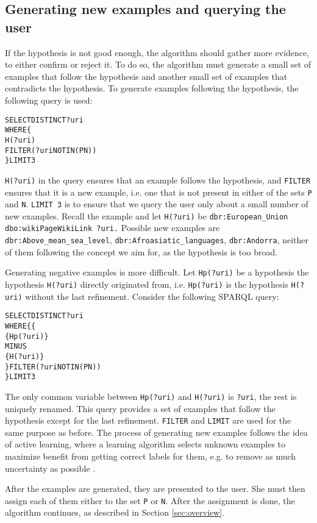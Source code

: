 \documentclass{llncs}
\begin{document}
\subsection{Generating new examples and querying the user\label{sec:new_examples}}

If the hypothesis is not good enough, the algorithm should gather more evidence, to either confirm or reject it.
To do so, the algorithm must generate a small set of examples that follow the hypothesis and another small set of examples that contradicts the hypothesis.
To generate examples following the hypothesis, the following query is used:
\begin{alltt}
SELECT DISTINCT ?uri
WHERE \{
    H(?uri)
    FILTER(?uri NOT IN (P N))
\} LIMIT 3
\end{alltt}
\texttt{H(?uri)} in the query ensures that an example follows the hypothesis, and \texttt{FILTER} ensures that it is a new example, i.e. one that is not present in either of the sets \texttt{P} and \texttt{N}.
\texttt{LIMIT 3} is to ensure that we query the user only about a small number of new examples.
Recall the example and let \texttt{H(?uri)} be \texttt{dbr:European\_Union dbo:wikiPageWikiLink ?uri.} Possible new examples are \texttt{dbr:Above\_mean\_sea\_level}, \texttt{dbr:Afroasiatic\_languages}, \texttt{dbr:Andorra}, neither of them following the concept we aim for, as the hypothesis is too broad.

Generating negative examples is more difficult.
Let \texttt{Hp(?uri)} be a hypothesis the hypothesis \texttt{H(?uri)} directly originated from, i.e. \texttt{Hp(?uri)} is the hypothesis \texttt{H(?uri)} without the last refinement.
Consider the following SPARQL query:
\begin{alltt}
SELECT DISTINCT ?uri
WHERE \{\{
        \{ Hp(?uri) \}
        MINUS
        \{ H(?uri) \}
    \} FILTER(?uri NOT IN (P N))
\} LIMIT 3
\end{alltt}
The only common variable between \texttt{Hp(?uri)} and \texttt{H(?uri)} is \texttt{?uri}, the rest is uniquely renamed.
This query provides a set of examples that follow the hypothesis except for the last refinement.
\texttt{FILTER} and \texttt{LIMIT} are used for the same purpose as before.
The process of generating new examples follows the idea of active learning, where a learning algorithm selects unknown examples to maximize benefit from getting correct labels for them, e.g. to remove as much uncertainty as possible \cite{Cohn2010}.

After the examples are generated, they are presented to the user.
She must then assign each of them either to the set \texttt{P} or \texttt{N}.
After the assignment is done, the algorithm continues, as described in Section \ref{sec:overview}.
\end{document}
